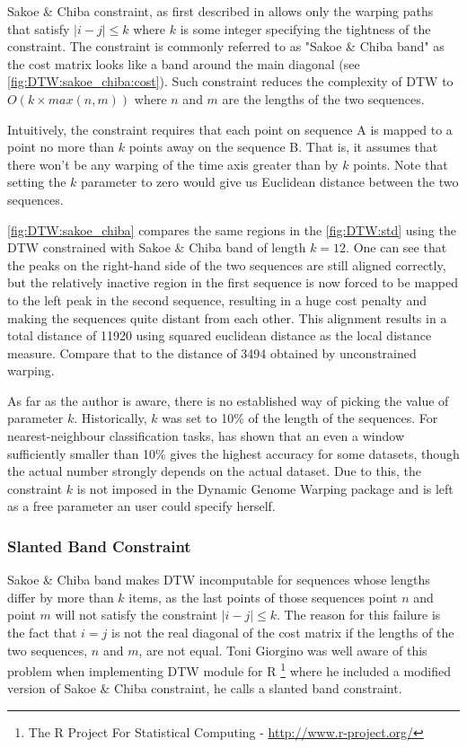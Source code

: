 \documentclass[parskip]{cs4rep}
\begin{document}
Sakoe \& Chiba constraint, as first described in \citep{Sakoe:1978ta} allows only the warping paths 
that satisfy $|i-j| \le k$ where $k$ is some integer specifying the tightness of the constraint. The constraint is commonly referred to as "Sakoe \& Chiba band" as the cost matrix looks like a band around the main diagonal (see \autoref{fig:DTW:sakoe_chiba:cost}). Such constraint reduces the complexity of DTW to $O(k \times max(n,m))$ where $n$ and $m$ are the lengths of the two sequences. 

Intuitively, the constraint requires that each point on sequence A is mapped to a point no more than $k$ points away on the sequence B. That is, it assumes that there won't be any warping of the time axis greater than by $k$ points. Note that setting the $k$ parameter to zero would give us Euclidean distance between the two sequences.

\autoref{fig:DTW:sakoe_chiba} compares the same regions in the \autoref{fig:DTW:std} using the DTW constrained with Sakoe \& Chiba band of length $k=12$. One can see that the peaks on the right-hand side of the two sequences are still aligned correctly, but the relatively inactive region in the first sequence is now forced to be mapped to the left peak in the second sequence, resulting in a huge cost penalty and making the sequences quite distant from each other. This alignment results in a total distance of 11920 using squared euclidean distance as the local distance measure. Compare that to the distance of 3494 obtained by unconstrained warping.

As far as the author is aware, there is no established way of picking the value of parameter $k$.
Historically, $k$ was set to 10\% of the length of the sequences.
For nearest-neighbour classification tasks, \cite{Ratanamahatana:2004wu} has shown that an even a window sufficiently smaller than 10\% gives the highest accuracy for some datasets, though the actual number strongly depends on the actual dataset. Due to this, the constraint $k$ is not imposed in the Dynamic Genome Warping package and is left as a free parameter an user could specify herself.

\subsubsection{Slanted Band Constraint}
\label{sec:slanted-band-constraint}

Sakoe \& Chiba band makes DTW incomputable for sequences whose lengths differ by more than $k$ items, as the last points of those sequences point $n$ and point $m$ will not satisfy the constraint 
$|i-j| \le k$. The reason for this failure is the fact that $i=j$ is not the real diagonal of the cost matrix if the lengths of the two sequences, $n$ and $m$, are not equal. 
Toni Giorgino \nocite{Giorgino:2009ue} was well aware of this problem when implementing DTW module for R \footnote{The R Project For Statistical Computing - \url{http://www.r-project.org/}} where he included a modified version of Sakoe \& Chiba constraint, he calls a slanted band constraint\citep{Giorgino:2009ue}. 
\end{document}
